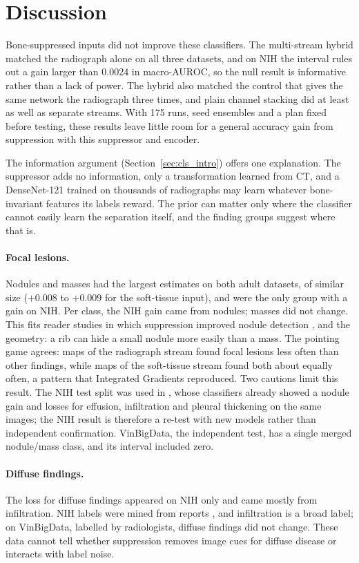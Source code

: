 \section{Discussion}
\label{sec:cls_discussion}
Bone-suppressed inputs did not improve these classifiers. The multi-stream hybrid matched the radiograph alone on all three datasets, and on
NIH the interval rules out a gain larger than 0.0024 in macro-AUROC, so the null result is informative rather than a lack of power. The
hybrid also matched the control that gives the same network the radiograph three times, and plain channel stacking did at least as well as
separate streams. With 175 runs, seed ensembles and a plan fixed before testing, these results leave little room for a general accuracy
gain from suppression with this suppressor and encoder.

The information argument (Section~\ref{sec:cls_intro}) offers one explanation. The suppressor adds no information, only a transformation learned from
CT, and a DenseNet-121 trained on thousands of radiographs may learn whatever bone-invariant features its labels reward. The prior
can matter only where the classifier cannot easily learn the separation itself, and the finding groups suggest where that is.

\paragraph{Focal lesions.} Nodules and masses had the largest estimates on both adult datasets, of similar size ($+0.008$ to $+0.009$ for
the soft-tissue input), and were the only group with a gain on NIH. Per class, the NIH gain came from nodules; masses did not change. This
fits reader studies in which suppression improved nodule detection \citep{freedman2011lung}, and the geometry: a rib can hide a small
nodule more easily than a mass. The pointing game agrees: maps of the radiograph stream found focal lesions less often than other findings,
while maps of the soft-tissue stream found both about equally often, a pattern that Integrated Gradients reproduced. Two cautions limit this result. The NIH test split was used in , whose
classifiers already showed a nodule gain and losses for effusion, infiltration and pleural thickening on the same images; the NIH result
is therefore a re-test with new models rather than independent confirmation. VinBigData, the independent test, has a single merged
nodule/mass class, and its interval included zero.

\paragraph{Diffuse findings.} The loss for diffuse findings appeared on NIH only and came mostly from infiltration. NIH labels were mined
from reports \citep{wang2017chestxray}, and infiltration is a broad label; on VinBigData, labelled by radiologists,
diffuse findings did not change. These data cannot tell whether suppression removes image cues for diffuse disease or interacts with label
noise.

